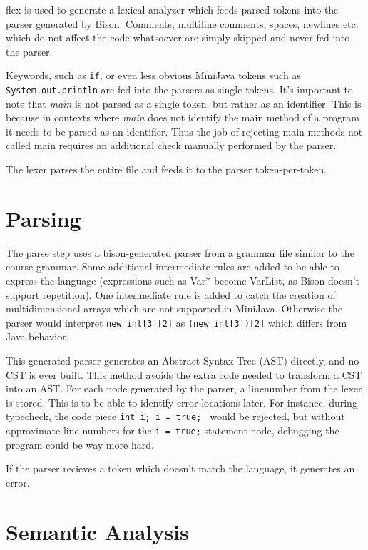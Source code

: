 \documentclass[a4paper,11pt]{article}
\begin{document}
flex is used to generate a lexical analyzer which feeds parsed tokens into the
parser generated by Bison. Comments, multiline comments, spaces, newlines etc.
which do not affect the code whatsoever are simply skipped and never fed into
the parser.

Keywords, such as {\tt if}, or even less obvious MiniJava tokens such as {\tt
System.out.println} are fed into the parsers as single tokens. It's important
to note that \emph{main} is not parsed as a single token, but rather as an
identifier. This is because in contexts where \emph{main} does not identify
the main method of a program it needs to be parsed as an identifier. Thus the
job of rejecting main methods not called main requires an additional check
manually performed by the parser.

The lexer parses the entire file and feeds it to the parser token-per-token.

\section*{Parsing}

The parse step uses a bison-generated parser from a grammar file similar to the
course grammar. Some additional intermediate rules are added to be able to
express the language (expressions such as Var* become VarList, as Bison doesn't
support repetition). One intermediate rule is added to catch the creation of
multidimensional arrays which are not supported in MiniJava. Otherwise the
parser would interpret {\tt new int[3][2]} as {\tt (new int[3])[2]} which
differs from Java behavior.

This generated parser generates an Abstract Syntax Tree (AST) directly, and no
CST is ever built. This method avoids the extra code needed to transform a CST
into an AST. For each node generated by the parser, a linenumber from the lexer
is stored. This is to be able to identify error locations later. For instance,
during typecheck, the code piece {\tt int i; i = true; } would be rejected,
but without approximate line numbers for the {\tt i = true;} statement node,
debugging the program could be way more hard.

If the parser recieves a token which doesn't match the language, it generates
an error.

\section*{Semantic Analysis}
\end{document}
